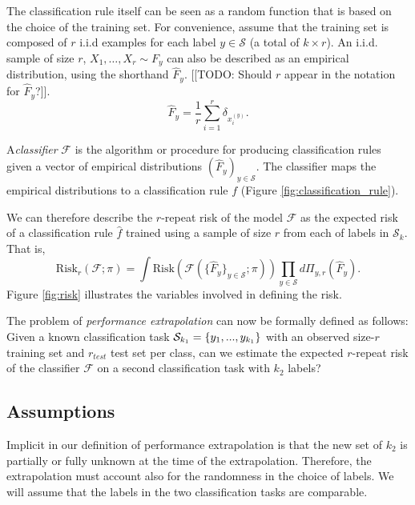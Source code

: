\documentclass[12pt]{article}
\begin{document}
The classification rule itself can be seen as a random function that
is based on the choice of the training set. For convenience, assume
that the training set is composed of $r$ i.i.d examples for
each label $y \in \mathcal{S}$ (a total of $k\times r$).  An
i.i.d. sample of size $r$, $X_1,\hdots, X_r \sim F_y$ can also be
described as an empirical distribution, using the shorthand
$\hat{F}_y$. [[TODO: Should $r$ appear in the notation for $\hat{F}_y$?]].
\[\hat{F}_y = \frac{1}{r}\sum_{i=1}^r \delta_{x_i^{(y)}}.\]


A\emph{classifier} $\mathcal{F}$ is the algorithm or procedure for
producing classification rules given a vector of empirical
distributions $(\hat{F}_y)_{y\in \mathcal{S}}$.  The classifier maps
the empirical distributions to a classification rule $f$
(Figure \ref{fig:classification_rule}).

We can therefore describe the $r$-repeat risk of the model $\mathcal{F}$
as the expected risk of a classification rule $\hat{f}$ trained 
using a sample of size $r$ from each of labels in $\mathcal{S}_k$.
That is,
\[
\text{Risk}_r(\mathcal{F}; \pi) =
\int \text{Risk}(\mathcal{F}(\{\hat{F}_y\}_{y \in \mathcal{S}};
\pi)) \prod_{y \in \mathcal{S}} d\Pi_{y, r}(\hat{F}_y).
\]
Figure \ref{fig:risk} illustrates the variables involved in defining
the risk.

The problem of \emph{performance extrapolation} can now be formally
defined as follows: Given a known classification task
$\mathcal{S}_{k_1}=\{y_1,...,y_{k_1}\}$ with an observed size-$r$ training set
and $r_{test}$ test set per class, can we estimate the expected
$r$-repeat risk of the classifier $\mathcal{F}$ on a second
classification task with $k_2$ labels?

\subsection{Assumptions}

Implicit in our definition of performance extrapolation is that the
new set of $k_2$ is partially or fully unknown at the time of the
extrapolation. Therefore, the extrapolation must account also for the
randomness in the choice of labels. We will assume that the labels in
the two classification tasks are comparable.
\end{document}
